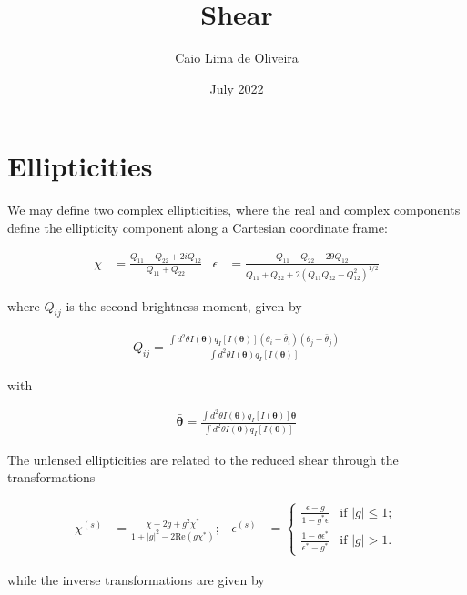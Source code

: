 \documentclass{article}
\title{Shear}
\author{Caio Lima de Oliveira}
\date{July 2022}
\begin{document}
\maketitle

\section{Ellipticities}

We may define two complex ellipticities, where the real and complex components define the ellipticity component along a Cartesian coordinate frame:

\begin{align}
    \chi &= \frac{Q_{11} - Q_{22} + 2iQ_{12}}{Q_{11} + Q_{22}} &  \epsilon &= \frac{Q_{11} - Q_{22} + 29 Q_{12}}{Q_{11} + Q_{22} + 2(Q_{11} Q_{22} - Q_{12}^2)^{1/2}}
\end{align}

\noindent where $Q_{ij}$ is the second brightness moment, given by

\begin{align}
    Q_{ij} = \frac{\int d^2 \theta I (\boldsymbol{\theta}) q_{I}[I(\boldsymbol{\theta})] (\theta_i - \bar{\theta}_i)(\theta_j - \bar{\theta}_j) }{\int d^2 \theta I(\boldsymbol{\theta}) q_{I} [I(\boldsymbol{\theta})]}
\end{align}

\noindent with

\begin{align}
    \bar{\boldsymbol{\theta}} = \frac{\int d^2 \theta I(\boldsymbol{\theta}) q_{I} [I(\boldsymbol{\theta})] \boldsymbol{\theta}}{\int d^2 \theta I(\boldsymbol{\theta}) q_{I} [I(\boldsymbol{\theta})]}
\end{align}


The unlensed ellipticities are related to the reduced shear through the transformations

\begin{align}
    \chi^{(s)} &= \frac{\chi - 2g + g^2\chi^*}{1 + |g|^2 - 2 \text{Re}(g\chi^*)}; &  \epsilon^{(s)} & = \begin{cases}
                  \frac{\epsilon - g}{1 - g^* \epsilon} & \text{if } |g| \leq 1; \\
                  \frac{1 - g\epsilon^*}{\epsilon^* - g^*} & \text{if } |g| > 1.
              \end{cases}
\end{align}

\noindent while the inverse transformations are given by 
\end{document}
